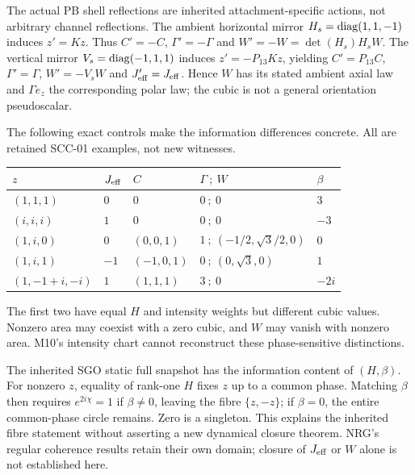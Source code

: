 \documentclass[11pt,a4paper]{article}
\numberwithin{equation}{section}
\begin{document}
The actual PB shell reflections are inherited attachment-specific actions, not arbitrary channel reflections. The ambient horizontal mirror $H_s=\operatorname{diag}(1,1,-1)$ induces $z'=Kz$. Thus $C'=-C$, $\Gamma'=-\Gamma$ and $W'=-W=\det(H_s)H_sW$. The vertical mirror $V_s=\operatorname{diag}(-1,1,1)$ induces $z'=-P_{13}Kz$, yielding $C'=P_{13}C$, $\Gamma'=\Gamma$, $W'=-V_sW$ and $J_{\rm eff}'=J_{\rm eff}$. Hence $W$ has its stated ambient axial law and $\Gamma e_z$ the corresponding polar law; the cubic is not a general orientation pseudoscalar.

The following exact controls make the information differences concrete. All are retained SCC-01 examples, not new witnesses.
\begin{center}\small
\begin{tabular}{@{}lllll@{}}\toprule
$z$ & $J_{\rm eff}$ & $C$ & $\Gamma\ ;\ W$ & $\beta$\\\midrule
$(1,1,1)$ & $0$ & $0$ & $0\ ;\ 0$ & $3$\\
$(i,i,i)$ & $1$ & $0$ & $0\ ;\ 0$ & $-3$\\
$(1,i,0)$ & $0$ & $(0,0,1)$ & $1\ ;\ (-1/2,\sqrt3/2,0)$ & $0$\\
$(1,i,1)$ & $-1$ & $(-1,0,1)$ & $0\ ;\ (0,\sqrt3,0)$ & $1$\\
$(1,-1+i,-i)$ & $1$ & $(1,1,1)$ & $3\ ;\ 0$ & $-2i$\\\bottomrule
\end{tabular}
\end{center}
The first two have equal $H$ and intensity weights but different cubic values. Nonzero area may coexist with a zero cubic, and $W$ may vanish with nonzero area. M10's intensity chart cannot reconstruct these phase-sensitive distinctions.

The inherited SGO static full snapshot has the information content of $(H,\beta)$. For nonzero $z$, equality of rank-one $H$ fixes $z$ up to a common phase. Matching $\beta$ then requires $e^{2i\chi}=1$ if $\beta\ne0$, leaving the fibre $\{z,-z\}$; if $\beta=0$, the entire common-phase circle remains. Zero is a singleton. This explains the inherited fibre statement without asserting a new dynamical closure theorem. NRG's regular coherence results retain their own domain; closure of $J_{\rm eff}$ or $W$ alone is not established here.
\end{document}
